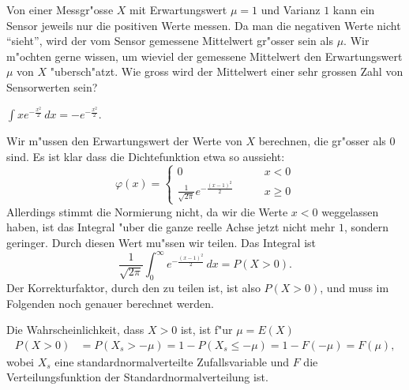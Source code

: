 Von einer Messgr"osse $X$ mit Erwartungswert $\mu=1$ und Varianz $1$
kann ein Sensor jeweils nur die positiven Werte messen.
Da man die negativen Werte nicht ``sieht'', wird der vom Sensor gemessene
Mittelwert gr"osser sein als $\mu$.
Wir m"ochten gerne wissen, um wieviel der gemessene Mittelwert den Erwartungswert
$\mu$ von $X$ "ubersch"atzt.
Wie gross wird der Mittelwert einer sehr grossen Zahl von Sensorwerten sein?

\begin{hinweis}
$\int xe^{-\frac{x^2}2}\,dx = -e^{-\frac{x^2}2}.$
\end{hinweis}

\begin{loesung}
Wir m"ussen den Erwartungswert der Werte von $X$ berechnen, die gr"osser
als $0$ sind. Es ist klar dass die Dichtefunktion etwa so aussieht:
\[
\varphi(x)=\begin{cases}
0&\qquad x<0\\
\frac1{\sqrt{2\pi}}e^{-\frac{(x-1)^2}2}&\qquad x\ge 0
\end{cases}
\]
Allerdings stimmt die Normierung nicht, da wir die Werte $x < 0$ weggelassen
haben, ist das Integral "uber die ganze reelle Achse jetzt nicht mehr $1$,
sondern geringer. Durch diesen Wert mu"ssen wir teilen. Das Integral ist
\[
\frac1{\sqrt{2\pi}}
\int_{0}^\infty
e^{-\frac{(x-1)^2}2}\,dx=
P(X > 0).
\]
Der Korrekturfaktor, durch den zu teilen ist, ist also $P(X>0)$, und muss im
Folgenden noch genauer berechnet werden.

Die Wahrscheinlichkeit, dass $X>0$ ist, ist f"ur $\mu=E(X)$
\begin{align*}
P(X>0)&=P(X_s > -\mu)=1-P(X_s\le-\mu)=1-F(-\mu)=F(\mu),
\end{align*}
wobei $X_s$ eine standardnormalverteilte Zufallsvariable und $F$ die
Verteilungsfunktion der Standardnormalverteilung ist.


\end{loesung}
